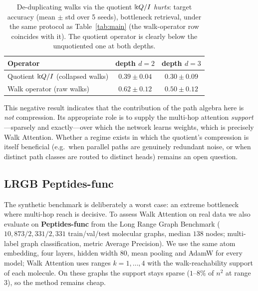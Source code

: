 \begin{table}[t]
\centering
\caption{De-duplicating walks via the quotient $\Bbbk Q/I$ \emph{hurts}: target
accuracy (mean $\pm$ std over 5 seeds), bottleneck retrieval, under the same
protocol as Table~\ref{tab:main} (the walk-operator row coincides with it). The
quotient operator is clearly below the unquotiented one at both depths.}
\label{tab:quotient}
\begin{tabular}{lcc}
\toprule
\textbf{Operator} & \textbf{depth $d=2$} & \textbf{depth $d=3$} \\
\midrule
Quotient $\Bbbk Q/I$ (collapsed walks) & $0.39\pm0.04$ & $0.30\pm0.09$ \\
Walk operator (raw walks)          & $\mathbf{0.62\pm0.12}$ & $\mathbf{0.50\pm0.12}$ \\
\bottomrule
\end{tabular}
\end{table}

This negative result indicates that the contribution of the path algebra here is
\emph{not} compression. Its appropriate role is to supply the multi-hop attention
\emph{support}---sparsely and exactly---over which the network learns weights,
which is precisely Walk Attention. Whether a regime exists in which the
quotient's compression is itself beneficial (e.g.\ when parallel paths are
genuinely redundant noise, or when distinct path classes are routed to distinct
heads) remains an open question.

\subsection{LRGB Peptides-func}

The synthetic benchmark is deliberately a worst case: an extreme bottleneck where
multi-hop reach is decisive. To assess Walk Attention on real data we also
evaluate on \textbf{Peptides-func} from the Long Range Graph Benchmark
\cite{dwivedi2022lrgb} ($10{,}873/2{,}331/2{,}331$ train/val/test molecular
graphs, median $138$ nodes; multi-label graph classification, metric Average
Precision). We use the same atom embedding, four layers, hidden width $80$, mean
pooling and AdamW for every model; Walk Attention uses ranges $k=1,\dots,4$ with
the walk-reachability support of each molecule. On these graphs the support stays
sparse ($1$--$8\%$ of $n^2$ at range $3$), so the method remains cheap.


